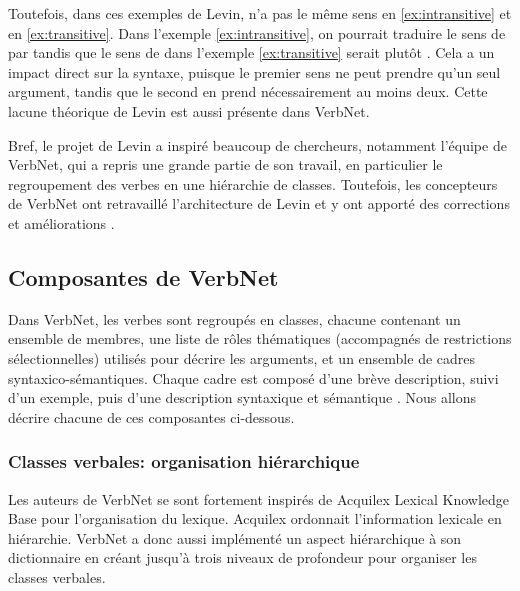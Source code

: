 Toutefois, dans ces exemples de Levin,  n'a pas le même sens en \ref{ex:intransitive} et en \ref{ex:transitive}. Dans l'exemple \ref{ex:intransitive}, on pourrait traduire le sens de  par  tandis que le sens de  dans l'exemple \ref{ex:transitive} serait plutôt . Cela a un impact direct sur la syntaxe, puisque le premier sens ne peut prendre qu'un seul argument, tandis que le second en prend nécessairement au moins deux. Cette lacune théorique de Levin est aussi présente dans VerbNet.

Bref, le projet de Levin a inspiré beaucoup de chercheurs, notamment l'équipe de VerbNet, qui a repris une grande partie de son travail, en particulier le regroupement des verbes en une hiérarchie de classes. Toutefois, les concepteurs de VerbNet ont retravaillé l'architecture de Levin et y ont apporté des corrections et améliorations \citep{verbnet.2006}.


\subsection {Composantes de VerbNet}

Dans VerbNet, les verbes sont regroupés en classes, chacune contenant un ensemble de membres, une liste de rôles thématiques (accompagnés de restrictions sélectionnelles) utilisés pour décrire les arguments, et un ensemble de cadres syntaxico-sémantiques. Chaque cadre est composé d'une brève description, suivi d'un exemple, puis d'une description syntaxique et sémantique \citep{SchulerVerbnetBroadcoverageComprehensive2005}. Nous allons décrire chacune de ces composantes ci-dessous.

\subsubsection{Classes verbales: organisation hiérarchique}\label{sec:vnarchitecture}

Les auteurs de VerbNet se sont fortement inspirés de Acquilex Lexical Knowledge Base \citep{CopestakeACQUILEXLKBrepresentation1992} pour l'organisation du lexique. Acquilex ordonnait l'information lexicale en hiérarchie. VerbNet a donc aussi implémenté un aspect hiérarchique à son dictionnaire en créant jusqu'à trois niveaux de profondeur pour organiser les classes verbales. 

